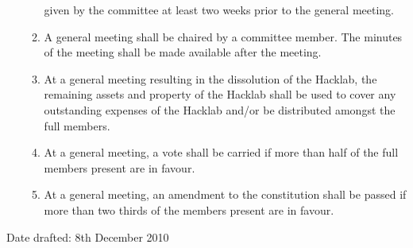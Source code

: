 \documentclass{article}
\begin{document}
\begin{enumerate}
\begin{enumerate}
        given by the committee at least two weeks prior to the general
        meeting.
      \item A general meeting shall be chaired by a committee
        member. The minutes of the meeting shall be made available
        after the meeting.
      \item At a general meeting resulting in the dissolution of the
        Hacklab, the remaining assets and property of the Hacklab
        shall be used to cover any outstanding expenses of the Hacklab
        and/or be distributed amongst the full members.
      \item At a general meeting, a vote shall be carried if more than
        half of the full members present are in favour.
      \item At a general meeting, an amendment to the constitution
        shall be passed if more than two thirds of the members present
        are in favour.
      \end{enumerate}
      
\end{enumerate}
\bigskip
Date drafted: 8th December 2010
\end{document}
